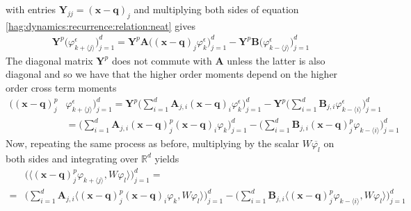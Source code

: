 with entries $\bm{Y}_{jj} = (\bm{x} - \bm{q})_j$
and multiplying both sides of equation 
\eqref{hag:dynamics:recurrence:relation:neat} gives 
\begin{equation}
  \begin{split}
    \bm{Y}^p\Big(\varphi^\epsilon_{k + \langle j \rangle}\Big)_{j=1}^d
    =
    \bm{Y}^p\bm{A} \Big( 
      (\bm{x} - \bm{q})_{j}\varphi^\epsilon_k
    \Big)_{j=1}^d
    - \bm{Y}^p\bm{B} \Big(
      \varphi^\epsilon_{k - \langle j  \rangle}
      \Big)_{j=1}^d
  \end{split}
\end{equation}
The diagonal matrix $\bm{Y}^p$ does not commute with 
$\bm{A}$ unless the latter is also diagonal and so we have
that the higher order moments depend on the higher order 
cross term moments
\begin{equation}
  \begin{split}
    \Big((\bm{x} - \bm{q})_j^p &
    \varphi^\epsilon_{k + \langle j \rangle}\Big)_{j=1}^d
    =
    \bm{Y}^p
    \Big(
      \sum_{i=1}^d
     \bm{A}_{j,i} 
     (\bm{x} - \bm{q})_{i}\varphi^\epsilon_k
    \Big)_{j=1}^d
    - \bm{Y}^p \Big(
      \sum_{i=1}^d
      \bm{B}_{j,i}
      \varphi^\epsilon_{k - \langle i  \rangle}
      \Big)_{j=1}^d
      \\
    &= 
    \Big(
      \sum_{i=1}^d
     \bm{A}_{j,i} 
     (\bm{x} - \bm{q})^p_j(\bm{x} - \bm{q})_{i}\varphi_k
    \Big)_{j=1}^d
    - \Big(
      \sum_{i=1}^d
      \bm{B}_{j,i}
      (\bm{x}-\bm{q})_j^p
      \varphi_{k - \langle i  \rangle}
      \Big)_{j=1}^d
  \end{split}
\end{equation}
Now, repeating the same process as before, 
multiplying by the scalar $W\overline{\varphi_l}$
on both sides and integrating over $\mathbb{R}^d$ 
yields 
\begin{equation}
  \begin{split}
    &\Big(
      \langle (\bm{x} - \bm{q})_j^p 
    \varphi_{k + \langle j \rangle},
    W \varphi_l \rangle
  \Big)_{j=1}^d
    =
    \\
      =&
    \Big(
      \sum_{i=1}^d
     \bm{A}_{j,i} 
     \langle (\bm{x} - \bm{q})^p_j(\bm{x} - \bm{q})_{i}\varphi_k, 
    W \varphi_l \rangle
    \Big)_{j=1}^d
    - \Big(
      \sum_{i=1}^d
      \bm{B}_{j,i}
      \langle 
      (\bm{x} - \bm{q})_j^p
      \varphi_{k - \langle i  \rangle}
      , W \varphi_l \rangle
      \Big)_{j=1}^d
  \end{split}
  \label{hag:dynamics:recurrence:relation:inner:product:p}
\end{equation}
